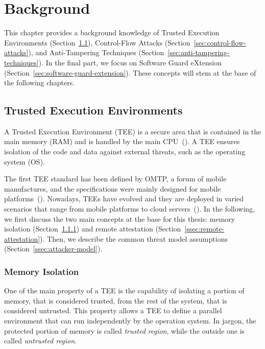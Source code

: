 \chapter{Background}
\label{chp:background} 

This chapter provides a background knowledge of Trusted Execution Environments 
(Section~\ref{sec:trusted-execution-enviroments}), Control-Flow Attacks 
(Section~\ref{sec:control-flow-attacks}), and Anti-Tampering Techniques 
(Section~\ref{sec:anti-tampering-techniques}).
In the final part, we focus on Software Guard eXtension 
(Section~\ref{sec:software-guard-extension}).
These concepts will stem at the base of the following chapters.

\section{Trusted Execution Environments}
\label{sec:trusted-execution-enviroments}

A Trusted Execution Environment (TEE) is a secure area that is contained in the 
main memory (RAM) and is handled by the main CPU~(\cite{Sabt2015TrustedEE}).
A TEE ensures isolation of the code and data against external threats, such as 
the operating system (OS).

The first TEE standard has been defined by OMTP, a forum of mobile 
manufactures, and the specifications were mainly designed for mobile 
platforms~(\cite{omtp}).
Nowadays, TEEs have evolved and they are deployed in varied scenarios that 
range from mobile platforms to cloud servers~(\cite{schuster2015vc3,sgxtor}).
In the following, we first discuss the two main concepts at the base for this 
thesis: memory isolation (Section~\ref{ssec:memory-isolation}) and remote 
attestation (Section~\ref{ssec:remote-attestation}).
Then, we describe the common threat model assumptions 
(Section~\ref{ssec:attacker-model}).

\subsection{Memory Isolation}
\label{ssec:memory-isolation}

One of the main property of a TEE is the capability of isolating a portion of 
memory, that is considered trusted, from the rest of the system, that  is 
considered untrusted.
This property allows a TEE to define a parallel environment that can run 
independently by the operation system.
In jargon, the protected portion of memory is called \emph{trusted 
region}, while the outside one is called \emph{untrusted region}.

